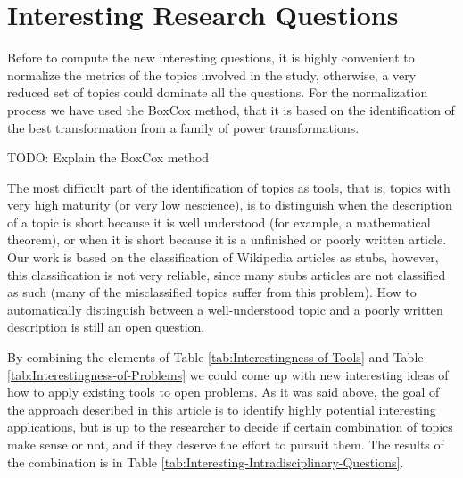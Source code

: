 \section{Interesting Research Questions}

Before to compute the new interesting questions, it is highly convenient to normalize the metrics of the topics involved in the study, otherwise, a very reduced set of topics could dominate all the questions. For the normalization process we have used the BoxCox method, that it is based on the identification of the best transformation from a family of power transformations.

{\color{red} TODO: Explain the BoxCox method} 

The most difficult part of the identification of topics as tools, that is, topics with very high maturity (or very low nescience), is to distinguish when the description of a topic is short because it is well understood (for example, a mathematical theorem), or when it is short because it is a unfinished or poorly written article. Our work is based on the classification of Wikipedia articles as stubs, however, this classification is not very reliable, since many stubs articles are not classified as such (many of the misclassified topics suffer from this problem). How to automatically distinguish between a well-understood topic and a poorly written description is still an open question.

By combining the elements of Table \ref{tab:Interestingness-of-Tools}
and Table \ref{tab:Interestingness-of-Problems} we could come up
with new interesting ideas of how to apply existing tools to open
problems. As it was said above, the goal of the approach described
in this article is to identify highly potential interesting applications,
but is up to the researcher to decide if certain combination of topics
make sense or not, and if they deserve the effort to pursuit them.
The results of the combination is in Table \ref{tab:Interesting-Intradisciplinary-Questions}.

